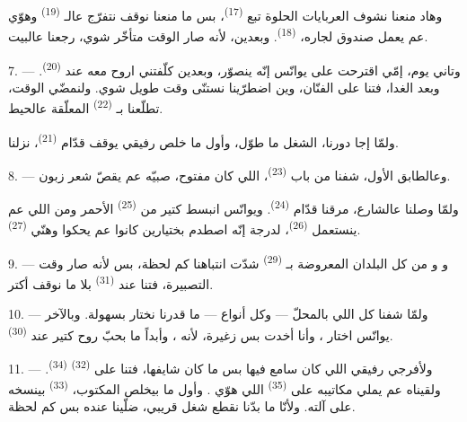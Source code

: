 وهاد منعنا نشوف العربايات الحلوة تبع 
\textsuperscript{(17)}، بس ما منعنا نوقف نتفرّج عالـ
\textsuperscript{(19)} وهوّي عم يعمل صندوق لجاره،  \textsuperscript{(18)}. وبعدين، لأنه صار الوقت
متأخّر شوي، رجعنا عالبيت.

\VUsaut{3.0mm}

7. --- وتاني يوم، إمّي اقترحت على يوانّس إنّه ينصوّر، وبعدين كلّفتني
اروح معه عند  \textsuperscript{(20)}. وبعد الغدا، فتنا
على  الفنّان، وين اضطرّينا نستنّى وقت طويل شوي. ولنمضّي
الوقت، تطلّعنا بـ \textsuperscript{(22)} المعلّقة عالحيط.

ولمّا إجا دورنا، الشغل ما طوّل، وأول ما خلص رفيقي يوقف قدّام
 \textsuperscript{(21)}، نزلنا.

8. --- وعالطابق الأول، شفنا من باب  \textsuperscript{(23)}،
اللي كان مفتوح، صبيّه عم يقصّ شعر زبون.

ولمّا وصلنا عالشارع، مرقنا قدّام 
\textsuperscript{(24)}. ويوانّس انبسط كتير من 
\textsuperscript{(25)} الأحمر ومن  اللي عم
ينستعمل  \textsuperscript{(26)}، لدرجة إنّه اصطدم بختيارين
كانوا عم يحكوا وهنّي  \textsuperscript{(27)}.

\VUsaut{3.0mm}

9. --- و و من كل البلدان
المعروضة بـ  \textsuperscript{(29)} شدّت
انتباهنا كم لحظة، بس لأنه صار وقت التصبيرة، فتنا عند
 \textsuperscript{(31)} بلا ما نوقف أكتر.

10. --- ولمّا شفنا كل  اللي بالمحلّ —
 وكل أنواع  — ما قدرنا
نختار بسهولة. وبالآخر يوانّس اختار ، وأنا أخدت بس
 زغيرة، لأنه ، وأبداً ما
بحبّ روح كتير عند  \textsuperscript{(30)}.

\VUsaut{3.0mm}

11. --- ولأفرجي رفيقي  اللي كان سامع فيها بس ما
كان شايفها، فتنا على  \textsuperscript{(32)}  \textsuperscript{(34)}. ولقيناه عم يملي مكاتيبه على
 \textsuperscript{(35)} اللي هوّي . وأول ما
بيخلص المكتوب،  \textsuperscript{(33)} بينسخه على
آلته. ولأنّا ما بدّنا نقطع شغل قريبي، ضلّينا عنده بس كم لحظة.

